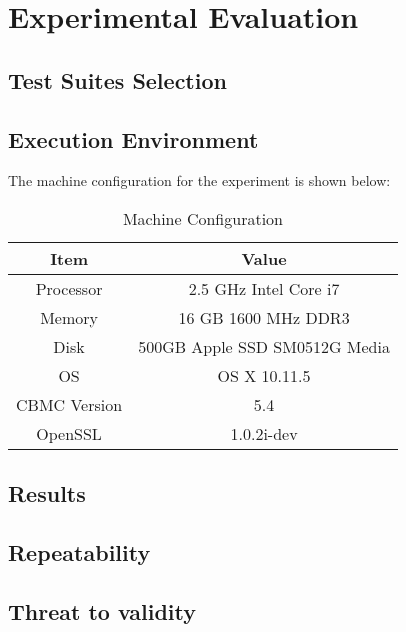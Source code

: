 \chapter{Experimental Evaluation}

\section{Test Suites Selection}

\section{Execution Environment}

The machine configuration for the experiment is shown below:
\begin{table}[H]
    \centering
    \begin{tabular}{c|c}
        \hline
        Item & Value \\
        \hline
        Processor & 2.5 GHz Intel Core i7\\
        Memory & 16 GB 1600 MHz DDR3\\
        Disk & 500GB Apple SSD SM0512G Media\\
        OS & OS X 10.11.5\\
        CBMC Version & 5.4\\ 
        OpenSSL & 1.0.2i-dev \\
        \hline
    \end{tabular}
    \caption{Machine Configuration}
    \label{tab:mc}
\end{table}

\section{Results}
\section{Repeatability}
\section{Threat to validity} %

